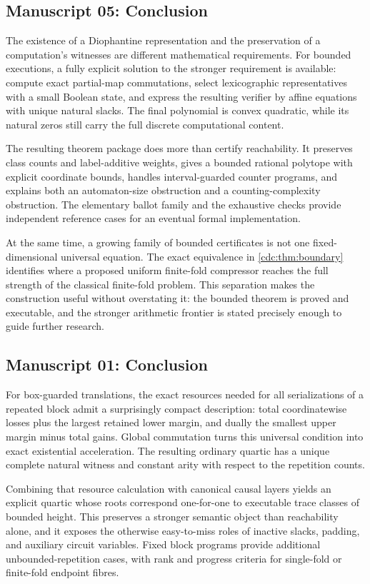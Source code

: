 \documentclass[11pt,a4paper]{article}
\theoremstyle{definition}
\theoremstyle{remark}
\begin{document}
\subsection{Manuscript 05: Conclusion}
The existence of a Diophantine representation and the preservation of a computation's witnesses are different mathematical requirements. For bounded executions, a fully explicit solution to the stronger requirement is available: compute exact partial-map commutations, select lexicographic representatives with a small Boolean state, and express the resulting verifier by affine equations with unique natural slacks. The final polynomial is convex quadratic, while its natural zeros still carry the full discrete computational content.

The resulting theorem package does more than certify reachability. It preserves class counts and label-additive weights, gives a bounded rational polytope with explicit coordinate bounds, handles interval-guarded counter programs, and explains both an automaton-size obstruction and a counting-complexity obstruction. The elementary ballot family and the exhaustive checks provide independent reference cases for an eventual formal implementation.

At the same time, a growing family of bounded certificates is not one fixed-dimensional universal equation. The exact equivalence in \cref{cdc:thm:boundary} identifies where a proposed uniform finite-fold compressor reaches the full strength of the classical finite-fold problem. This separation makes the construction useful without overstating it: the bounded theorem is proved and executable, and the stronger arithmetic frontier is stated precisely enough to guide further research.


\subsection{Manuscript 01: Conclusion}
For box-guarded translations, the exact resources needed for all serializations of a repeated block admit a surprisingly compact description: total coordinatewise losses plus the largest retained lower margin, and dually the smallest upper margin minus total gains. Global commutation turns this universal condition into exact existential acceleration. The resulting ordinary quartic has a unique complete natural witness and constant arity with respect to the repetition counts.

Combining that resource calculation with canonical causal layers yields an explicit quartic whose roots correspond one-for-one to executable trace classes of bounded height. This preserves a stronger semantic object than reachability alone, and it exposes the otherwise easy-to-miss roles of inactive slacks, padding, and auxiliary circuit variables. Fixed block programs provide additional unbounded-repetition cases, with rank and progress criteria for single-fold or finite-fold endpoint fibres.
\end{document}
